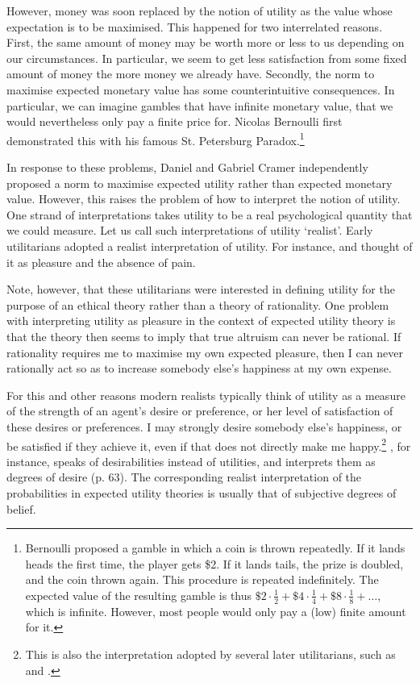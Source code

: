 However, money was soon replaced by the notion of utility as the value whose expectation is to be maximised. This happened for two interrelated reasons. First, the same amount of money may be worth more or less to us depending on our circumstances. In particular, we seem to get less satisfaction from some fixed amount of money the more money we already have. Secondly, the norm to maximise expected monetary value has some counterintuitive consequences. In particular, we can imagine gambles that have infinite monetary value, that we would nevertheless only pay a finite price for. Nicolas Bernoulli first demonstrated this with his famous St. Petersburg Paradox.\footnote{Bernoulli proposed a gamble in which a coin is thrown repeatedly. If it lands heads the first time, the player gets \$2. If it lands tails, the prize is doubled, and the coin thrown again. This procedure is repeated indefinitely. The expected value of the resulting gamble is thus $\$2 \cdot \frac{1}{2} + \$4 \cdot \frac{1}{4} + \$8 \cdot \frac{1}{8} +\ldots$, which is infinite. However, most people would only pay a (low) finite amount for it.}

In response to these problems, Daniel \citet{Bernouilli1738} and Gabriel Cramer independently proposed a norm to maximise expected utility rather than expected monetary value. However, this raises the problem of how to interpret the notion of utility. One strand of interpretations takes utility to be a real psychological quantity that we could measure. Let us call such interpretations of utility `realist'. Early utilitarians adopted a realist interpretation of utility. For instance, \citet{Bentham1789} and \citet{Mill1861} thought of it as pleasure and the absence of pain.

Note, however, that these utilitarians were interested in defining utility for the purpose of an ethical theory rather than a theory of rationality. One problem with interpreting utility as pleasure in the context of expected utility theory is that the theory then seems to imply that true altruism can never be rational. If rationality requires me to maximise my own expected pleasure, then I can never rationally act so as to increase somebody else's happiness at my own expense.

For this and other reasons modern realists typically think of utility as a measure of the strength of an agent's desire or preference, or her level of satisfaction of these desires or preferences. I may strongly desire somebody else's happiness, or be satisfied if they achieve it, even if that does not directly make me happy.\footnote{This is also the interpretation adopted by several later utilitarians, such as \citet{Hare1981} and \citet{Singer1993}.} \citet{Jeffrey1983}, for instance, speaks of desirabilities instead of utilities, and interprets them as degrees of desire (p. 63). The corresponding realist interpretation of the probabilities in expected utility theories is usually that of subjective degrees of belief.

